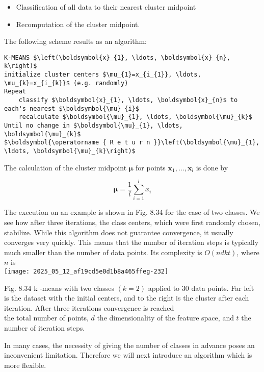 \documentclass[10pt]{article}
\begin{document}
\begin{itemize}
  \item Classification of all data to their nearest cluster midpoint
  \item Recomputation of the cluster midpoint.
\end{itemize}

The following scheme results as an algorithm:

\begin{verbatim}
K-MEANS $\left(\boldsymbol{x}_{1}, \ldots, \boldsymbol{x}_{n}, k\right)$
initialize cluster centers $\mu_{1}=x_{i_{1}}, \ldots, \mu_{k}=x_{i_{k}}$ (e.g. randomly)
Repeat
    classify $\boldsymbol{x}_{1}, \ldots, \boldsymbol{x}_{n}$ to each's nearest $\boldsymbol{\mu}_{i}$
    recalculate $\boldsymbol{\mu}_{1}, \ldots, \boldsymbol{\mu}_{k}$
Until no change in $\boldsymbol{\mu}_{1}, \ldots, \boldsymbol{\mu}_{k}$
$\boldsymbol{\operatorname { R e t u r n }}\left(\boldsymbol{\mu}_{1}, \ldots, \boldsymbol{\mu}_{k}\right)$
\end{verbatim}

The calculation of the cluster midpoint $\boldsymbol{\mu}$ for points $\boldsymbol{x}_{1}, \ldots, \boldsymbol{x}_{l}$ is done by

$$
\boldsymbol{\mu}=\frac{1}{l} \sum_{i=1}^{l} x_{i}
$$

The execution on an example is shown in Fig. 8.34 for the case of two classes. We see how after three iterations, the class centers, which were first randomly chosen, stabilize. While this algorithm does not guarantee convergence, it usually converges very quickly. This means that the number of iteration steps is typically much smaller than the number of data points. Its complexity is $O(n d k t)$, where $n$ is\\
\texttt{[image: 2025\_05\_12\_af19cd5e0d1b8a465ffeg-232]}

Fig. 8.34 k -means with two classes $(k=2)$ applied to 30 data points. Far left is the dataset with the initial centers, and to the right is the cluster after each iteration. After three iterations convergence is reached\\
the total number of points, $d$ the dimensionality of the feature space, and $t$ the number of iteration steps.

In many cases, the necessity of giving the number of classes in advance poses an inconvenient limitation. Therefore we will next introduce an algorithm which is more flexible.
\end{document}
